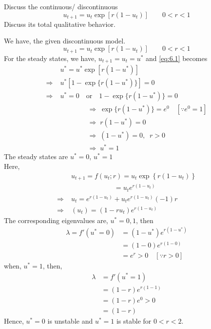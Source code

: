 \documentclass[../main-sheet.tex]{subfiles}
\begin{document}
\begin{prob}
    Discuss the continuous/ discontinuous
    \[u_{t+1}=u_t \exp [r(1-u_t)]\qquad 0<r<1\]
    Discuss its total qualitative behavior.
\end{prob}
\begin{soln}
    We have, the given discontinuous model.
    \begin{equation}
        u_{t+1}=u_t \exp [r(1-u_t)]\qquad 0<r<1\label{eq:6.1}
    \end{equation}
    For the steady states, we have, \(u_{t+1}=u_t=u^{*}\) and \eqref{eq:6.1} becomes
    \begin{align*}
        & u^{*}=u^{*} \exp [r(1-u^{*})]\\    
        \Rightarrow\; & u^{*}[1- \exp \{r(1-u^{*})\}]=0\\    
        \Rightarrow\; & u^{*}=0\quad \text{or} \quad 1- \exp \{r(1-u^{*})\}=0\\    
        & \qquad\qquad\Rightarrow\; \exp \{r(1-u^{*})\}=e^0\quad [\because e^0=1]\\    
        & \qquad\qquad\Rightarrow\; r(1-u^{*})=0\\    
        & \qquad\qquad\Rightarrow\; (1-u^{*})=0,\;\;r>0\\    
        & \qquad\qquad\Rightarrow\; u^{*}=1    
    \end{align*}
    The steady states are \(u^{*}=0\), \(u^{*}=1\)\\
    Here,
    \begin{align*}
        &u_{t+1}=f(u_t;r)=u_t \exp\left\{ r(1-u_t) \right\}\\
        &\qquad\qquad\qquad\;=u_t e^{ r(1-u_t)}\\
        \Rightarrow\; &u_t=e^{r(1-u_t) }+u_t e^{ r(1-u_t)}(-1)r\\
        \Rightarrow\; &(u_t)=(1-ru_t)e^{r(1-u_t) }
    \end{align*}
    The corresponding eigenvalues are, \(u^{*}=0,1\), then
    \begin{align*}
        \lambda=f'(u^{*}=0)&=(1-u^{*})e^{r(1-u^{*}) }\\
        &=(1-0)e^{r(1-0) }\\
        &=e^{r }>0\quad [\because r>0]
    \end{align*}
    when, \(u^{*}=1\), then,
    \begin{align*}
        \lambda&=f'(u^{*}=1)\\
        &=(1-r)e^{r(1-1) }\\
        &=(1-r) e^{0 }>0\\
        &=(1-r)
    \end{align*}
    Hence, \(u^{*}=0\) is unstable and \(u^{*}=1\) is stable for \(0<r<2\).
\end{soln}
\end{document}
